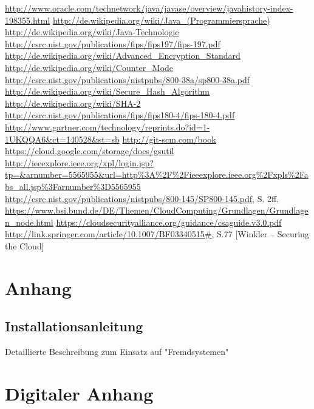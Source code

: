 \documentclass[12pt,a4paper,bibliography=totocnumbered,listof=totocnumbered]{scrartcl}
\begin{document}
	
 
 \begin{thebibliography}{xxxxxxxxxxxxxxxxxxx}
	\url{http://www.oracle.com/technetwork/java/javase/overview/javahistory-index-198355.html}
	\url{http://de.wikipedia.org/wiki/Java_(Programmiersprache)}
	\url{ http://de.wikipedia.org/wiki/Java-Technologie}
	\url{http://csrc.nist.gov/publications/fips/fips197/fips-197.pdf}
	\url{http://de.wikipedia.org/wiki/Advanced_Encryption_Standard}
	\url{http://de.wikipedia.org/wiki/Counter_Mode}
	\url{http://csrc.nist.gov/publications/nistpubs/800-38a/sp800-38a.pdf}
	\url{http://de.wikipedia.org/wiki/Secure_Hash_Algorithm}
	\url{http://de.wikipedia.org/wiki/SHA-2}
	\url{http://csrc.nist.gov/publications/fips/fips180-4/fips-180-4.pdf}
	\url{http://www.gartner.com/technology/reprints.do?id=1-1UKQQA6&ct=140528&st=sb}
 	\url{http://git-scm.com/book}
	\url{https://cloud.google.com/storage/docs/gsutil}	
	\url{http://ieeexplore.ieee.org/xpl/login.jsp?tp=&arnumber=5565955&url=http%3A%2F%2Fieeexplore.ieee.org%2Fxpls%2Fabs_all.jsp%3Farnumber%3D5565955}
	\url{http://csrc.nist.gov/publications/nistpubs/800-145/SP800-145.pdf}, S. 2ff.
	\url{https://www.bsi.bund.de/DE/Themen/CloudComputing/Grundlagen/Grundlagen_node.html}
	\url{https://cloudsecurityalliance.org/guidance/csaguide.v3.0.pdf}
	\url{http://link.springer.com/article/10.1007/BF03340515#},  S.77
	 [Winkler – Securing the Cloud]
	
\end{thebibliography}
\pagebreak

\setcounter{page}{1}

\begin{appendix}
\section*{Anhang}
{}

\subsection{Installationsanleitung}
Detaillierte Beschreibung zum Einsatz auf "Fremdsystemen"
\pagebreak
\section{Digitaler Anhang}
\end{appendix}
\end{document}
